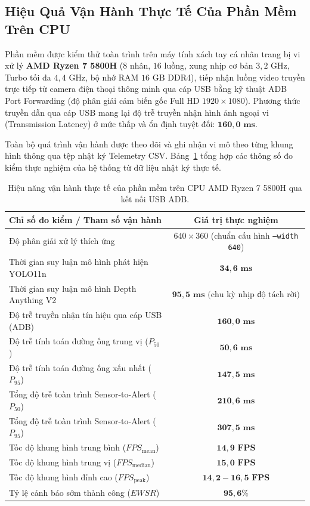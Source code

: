 \documentclass[12pt,a4paper]{article}
\begin{document}
\subsection{Hiệu Quả Vận Hành Thực Tế Của Phần Mềm Trên CPU}
\label{subsec:hieu_qua_phan_mem}
Phần mềm được kiểm thử toàn trình trên máy tính xách tay cá nhân trang bị vi xử lý \textbf{AMD Ryzen 7 5800H} ($8$ nhân, $16$ luồng, xung nhịp cơ bản $3,2\text{ GHz}$, Turbo tối đa $4,4\text{ GHz}$, bộ nhớ RAM $16\text{ GB}$ DDR4), tiếp nhận luồng video truyền trực tiếp từ camera điện thoại thông minh qua cáp USB bằng kỹ thuật ADB Port Forwarding (độ phân giải cảm biến gốc Full HD $1920 \times 1080$). Phương thức truyền dẫn qua cáp USB mang lại độ trễ truyền nhận hình ảnh ngoại vi (Transmission Latency) ở mức thấp và ổn định tuyệt đối: $\mathbf{160,0\text{ ms}}$.

Toàn bộ quá trình vận hành được theo dõi và ghi nhận vi mô theo từng khung hình thông qua tệp nhật ký Telemetry CSV. Bảng~\ref{tab:software_runtime_benchmark} tổng hợp các thông số đo kiểm thực nghiệm của hệ thống từ dữ liệu nhật ký thực tế.

\begin{table}[htbp]
\centering
\caption{Hiệu năng vận hành thực tế của phần mềm trên CPU AMD Ryzen 7 5800H qua kết nối USB ADB.}
\label{tab:software_runtime_benchmark}
\begin{tabular}{|l|c|}
\hline
\textbf{Chỉ số đo kiểm / Tham số vận hành} & \textbf{Giá trị thực nghiệm} \\ \hline
Độ phân giải xử lý thích ứng & $640 \times 360$ (chuẩn cấu hình \texttt{--width 640}) \\ \hline
Thời gian suy luận mô hình phát hiện YOLO11n & $\mathbf{34,6\text{ ms}}$ \\ \hline
Thời gian suy luận mô hình Depth Anything V2 & $\mathbf{95,5\text{ ms}}\text{ (chu kỳ nhịp độ tách rời)}$ \\ \hline
Độ trễ truyền nhận tín hiệu qua cáp USB (ADB) & $\mathbf{160,0\text{ ms}}$ \\ \hline
Độ trễ tính toán đường ống trung vị ($P_{50}$) & $\mathbf{50,6\text{ ms}}$ \\ \hline
Độ trễ tính toán đường ống xấu nhất ($P_{95}$) & $\mathbf{147,5\text{ ms}}$ \\ \hline
Tổng độ trễ toàn trình Sensor-to-Alert ($P_{50}$) & $\mathbf{210,6\text{ ms}}$ \\ \hline
Tổng độ trễ toàn trình Sensor-to-Alert ($P_{95}$) & $\mathbf{307,5\text{ ms}}$ \\ \hline
Tốc độ khung hình trung bình ($FPS_{\text{mean}}$) & $\mathbf{14,9\text{ FPS}}$ \\ \hline
Tốc độ khung hình trung vị ($FPS_{\text{median}}$) & $\mathbf{15,0\text{ FPS}}$ \\ \hline
Tốc độ khung hình đỉnh cao ($FPS_{\text{peak}}$) & $\mathbf{14,2 - 16,5\text{ FPS}}$ \\ \hline
Tỷ lệ cảnh báo sớm thành công ($EWSR$) & $\mathbf{95,6\%}$ \\ \hline
\end{tabular}
\end{table}
\end{document}
